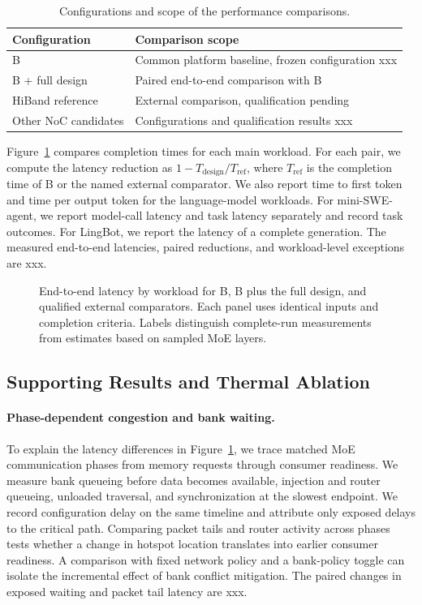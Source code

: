 \documentclass[conference,10pt]{IEEEtran}
\newcommand{\Description}[1]{}
\begin{document}
\begin{table}[t]
\caption{Configurations and scope of the performance comparisons.}
\label{tab:eval-comparisons}
\centering\small
\begin{tabular}{@{}lp{}@{}}
\hline
Configuration & Comparison scope \\
\hline
B & Common platform baseline, frozen configuration xxx \\
B + full design & Paired end-to-end comparison with B \\
HiBand reference & External comparison, qualification pending \\
Other NoC candidates & Configurations and qualification results xxx \\
\hline
\end{tabular}
\end{table}

Figure~\ref{fig:eval-overall} compares completion times for each main workload. For each pair, we compute the latency reduction as $1-T_{\mathrm{design}}/T_{\mathrm{ref}}$, where $T_{\mathrm{ref}}$ is the completion time of B or the named external comparator. We also report time to first token and time per output token for the language-model workloads. For mini-SWE-agent, we report model-call latency and task latency separately and record task outcomes. For LingBot, we report the latency of a complete generation. The measured end-to-end latencies, paired reductions, and workload-level exceptions are xxx.

\begin{figure}[t]
\centering
\fbox{\rule{0pt}{18mm}\rule{0.92\textwidth}{0pt}}
\caption{End-to-end latency by workload for B, B plus the full design, and qualified external comparators. Each panel uses identical inputs and completion criteria. Labels distinguish complete-run measurements from estimates based on sampled MoE layers.}
\Description{Reserved space for the end-to-end latency comparison.}
\label{fig:eval-overall}
\end{figure}

\subsection{Supporting Results and Thermal Ablation}

\paragraph{Phase-dependent congestion and bank waiting.}
To explain the latency differences in Figure~\ref{fig:eval-overall}, we trace matched MoE communication phases from memory requests through consumer readiness. We measure bank queueing before data becomes available, injection and router queueing, unloaded traversal, and synchronization at the slowest endpoint. We record configuration delay on the same timeline and attribute only exposed delays to the critical path. Comparing packet tails and router activity across phases tests whether a change in hotspot location translates into earlier consumer readiness. A comparison with fixed network policy and a bank-policy toggle can isolate the incremental effect of bank conflict mitigation. The paired changes in exposed waiting and packet tail latency are xxx.
\end{document}
